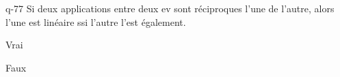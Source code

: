 \begin{truefalse}{q-77}
Si deux applications entre deux ev sont réciproques l'une de l'autre, alors l'une est linéaire ssi l'autre l'est également.
\item* Vrai
\item Faux
\end{truefalse}

